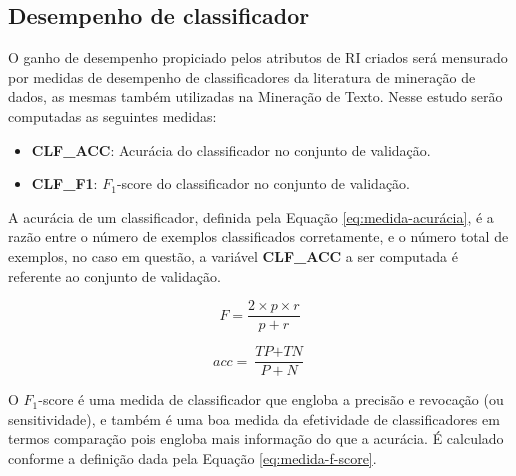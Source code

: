     \subsection{Desempenho de classificador}  \label{subsec:Desempenho-de-classificador}
        O ganho de desempenho propiciado pelos atributos de RI criados será mensurado por medidas de desempenho de classificadores da literatura de mineração de dados, as mesmas também utilizadas na Mineração de Texto.
        Nesse estudo serão computadas as seguintes medidas:
        \begin{itemize}
            \item \textbf{CLF\_ACC}: Acurácia do classificador no conjunto de validação.
            \item \textbf{CLF\_F1}: $F_1$-score do classificador no conjunto de validação.
        \end{itemize}
        A acurácia de um classificador, definida pela Equação \ref{eq:medida-acurácia}, é a razão entre o número de exemplos classificados corretamente, e o número total de exemplos, no caso em questão, a variável \textbf{CLF\_ACC} a ser computada é referente ao conjunto de validação.
        
        \noindent\begin{minipage}{.5\textwidth}
            \begin{equation}
                \label{eq:medida-f-score}
        		F = 
        		\frac{2 \times p \times r}{p + r}
            \end{equation}
        \end{minipage}
        \begin{minipage}{.5\textwidth}
            \begin{equation}
                \label{eq:medida-acurácia}
        		acc = 
        		\frac{\textit{TP} + \textit{TN}}{P + N}
            \end{equation}
        \end{minipage}

        O $F_1$-score é uma medida de classificador que engloba a precisão e revocação (ou sensitividade), e também é uma boa medida da efetividade de classificadores em termos comparação pois engloba mais informação do que a acurácia. 
        É calculado conforme a definição dada pela Equação \ref{eq:medida-f-score}.
        